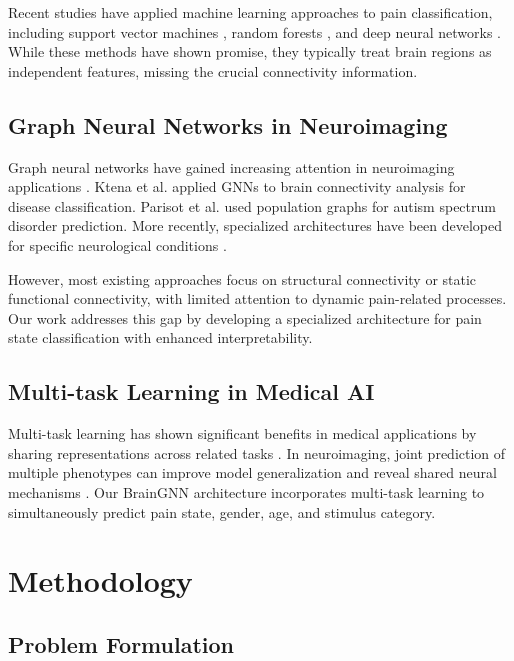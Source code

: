 \documentclass[10pt,journal,compsoc]{IEEEtran}
\begin{document}
Recent studies have applied machine learning approaches to pain classification, including support vector machines \cite{svm_pain_2020}, random forests \cite{rf_pain_2021}, and deep neural networks \cite{dnn_pain_2022}. While these methods have shown promise, they typically treat brain regions as independent features, missing the crucial connectivity information.

\subsection{Graph Neural Networks in Neuroimaging}

Graph neural networks have gained increasing attention in neuroimaging applications \cite{gnn_neuro_review_2023}. Ktena et al. \cite{ktena_2018} applied GNNs to brain connectivity analysis for disease classification. Parisot et al. \cite{parisot_2018} used population graphs for autism spectrum disorder prediction. More recently, specialized architectures have been developed for specific neurological conditions \cite{brain_gnn_recent_2023}.

However, most existing approaches focus on structural connectivity or static functional connectivity, with limited attention to dynamic pain-related processes. Our work addresses this gap by developing a specialized architecture for pain state classification with enhanced interpretability.

\subsection{Multi-task Learning in Medical AI}

Multi-task learning has shown significant benefits in medical applications by sharing representations across related tasks \cite{multitask_medical_2022}. In neuroimaging, joint prediction of multiple phenotypes can improve model generalization and reveal shared neural mechanisms \cite{multitask_neuro_2023}. Our BrainGNN architecture incorporates multi-task learning to simultaneously predict pain state, gender, age, and stimulus category.

\section{Methodology}

\subsection{Problem Formulation}
\end{document}
